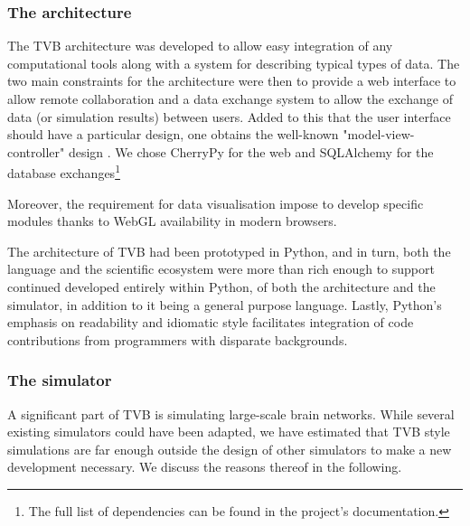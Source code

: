 \subsubsection{The architecture}


The TVB architecture was developed to allow easy integration of any
computational tools along with a system for describing typical types of data.
The two main constraints for the architecture were then to provide a web
interface to allow remote collaboration and a data exchange system to allow the
exchange of data (or simulation results) between users. Added to this that
the user interface should have a particular design, one obtains the well-known
"model-view-controller" design .  We chose
\textsf{CherryPy} for the web  and \textsf{SQLAlchemy} for the database
exchanges\footnote{The full list of dependencies can be found in the
project's documentation.}

Moreover, the requirement for data visualisation impose to develop specific
modules thanks to WebGL availability in modern browsers.

The architecture of TVB had been prototyped in Python, and in turn, both the
language and the scientific ecosystem were more than rich enough to support
continued developed entirely within Python, of both the architecture and the
simulator, in addition to it being a general purpose language. Lastly, Python's
emphasis on readability and idiomatic style facilitates integration of 
code contributions from programmers with disparate backgrounds.


\subsubsection{The simulator}

A significant part of TVB is simulating large-scale brain networks. While
several existing simulators could have been adapted, we have estimated that
TVB style simulations are far enough outside the design of other simulators to
make a new development necessary. We discuss the reasons thereof in the following. 

